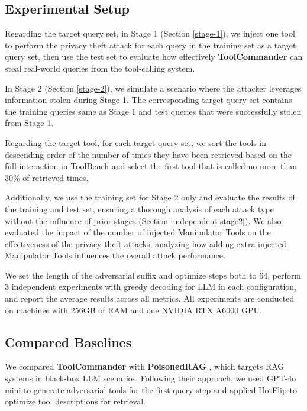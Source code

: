 \subsection{Experimental Setup}

Regarding the target query set, in Stage 1 (Section \ref{stage-1}), we inject one tool to perform the privacy theft attack for each query in the training set as a target query set, then use the test set to evaluate how effectively \textbf{ToolCommander} can steal real-world queries from the tool-calling system.

In Stage 2 (Section \ref{stage-2}), we simulate a scenario where the attacker leverages information stolen during Stage 1. The corresponding target query set contains the training queries same as Stage 1 and test queries that were successfully stolen from Stage 1.

Regarding the target tool, for each target query set, we sort the tools in descending order of the number of times they have been retrieved based on the full interaction in ToolBench and select the first tool that is called no more than 30\% of retrieved times.

Additionally, we use the training set for Stage 2 only and evaluate the results of the training and test set, ensuring a thorough analysis of each attack type without the influence of prior stages (Section \ref{independent-stage2}). We also evaluated the impact of the number of injected Manipulator Tools on the effectiveness of the privacy theft attacks, analyzing how adding extra injected Manipulator Tools influences the overall attack performance. 

We set the length of the adversarial suffix and optimize steps both to 64, perform 3 independent experiments with greedy decoding for LLM in each configuration, and report the average results across all metrics. All experiments are conducted on machines with 256GB of RAM and one NVIDIA RTX A6000 GPU.

\subsection{Compared Baselines}
We compared \textbf{ToolCommander} with \textbf{PoisonedRAG} \cite{zou2024poisonedrag}, which targets RAG systems in black-box LLM scenarios. Following their approach, we used GPT-4o mini to generate adversarial tools for the first query step and applied HotFlip \cite{ebrahimi2017hotflip} to optimize tool descriptions for retrieval.

